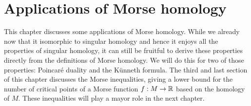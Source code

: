 \chapter{Applications of Morse homology}
\label{chap:app-morse-homology}

This chapter discusses some applications of Morse homology.
While we already now that it isomorphic to singular homology and hence it enjoys all the properties of singular homology, it can still be fruitful to derive these properties directly from the definitions of Morse homology.
We will do this for two of those properties: Poincaré duality and the Künneth formula.
The third and last section of this chapter discusses the Morse inequalities, giving a lower bound for the number of critical points of a Morse function $f: M \to  \mathbb{R}$ based on the homology of $M$.
These inequalities will play a mayor role in the next chapter.

